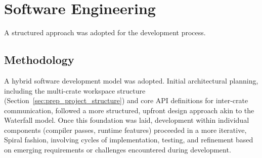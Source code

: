 \section{Software Engineering}\label{sec:prep_software_eng} %

A structured approach was adopted for the development process.

\subsection{Methodology}
A hybrid software development model was adopted. Initial architectural planning, including the multi-crate workspace structure (Section~\ref{sec:prep_project_structure}) and core API definitions for inter-crate communication, followed a more structured, upfront design approach akin to the Waterfall model. Once this foundation was laid, development within individual components (compiler passes, runtime features) proceeded in a more iterative, Spiral fashion, involving cycles of implementation, testing, and refinement based on emerging requirements or challenges encountered during development.


